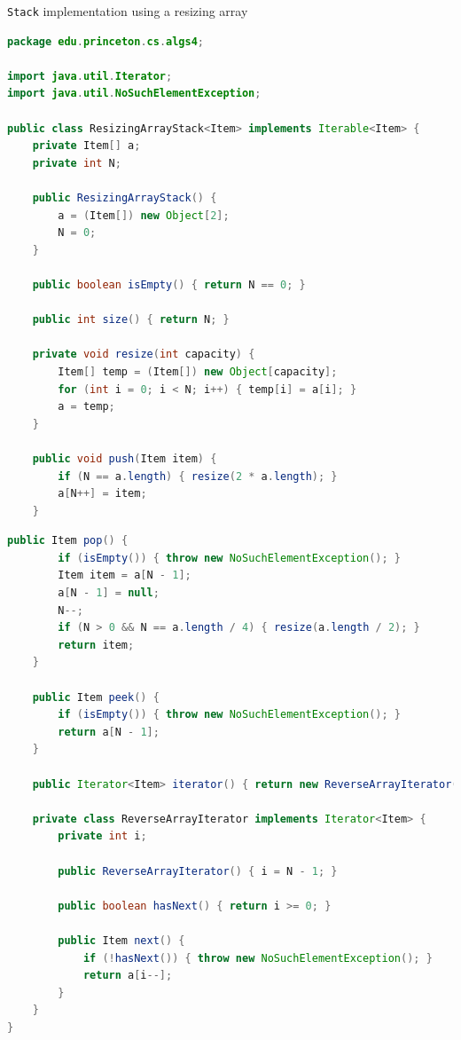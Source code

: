 \documentclass[8pt,a4paper,compress]{beamer}
\begin{document}
\begin{frame}[fragile]
\pause

\lstinline{Stack} implementation using a resizing array

\smallskip

\begin{lstlisting}[language=Java,style=focusin]
package edu.princeton.cs.algs4;

import java.util.Iterator;
import java.util.NoSuchElementException;

public class ResizingArrayStack<Item> implements Iterable<Item> {
    private Item[] a; 
    private int N; 
    
    public ResizingArrayStack() {
        a = (Item[]) new Object[2];
        N = 0;
    }

    public boolean isEmpty() { return N == 0; }

    public int size() { return N; }

    private void resize(int capacity) {
        Item[] temp = (Item[]) new Object[capacity];
        for (int i = 0; i < N; i++) { temp[i] = a[i]; }
        a = temp;
    }

    public void push(Item item) {
        if (N == a.length) { resize(2 * a.length); }
        a[N++] = item; 
    }
\end{lstlisting}
\end{frame}

\begin{frame}[fragile]
\pause

\begin{lstlisting}[language=Java,style=focusin]
    public Item pop() {
        if (isEmpty()) { throw new NoSuchElementException(); }
        Item item = a[N - 1];
        a[N - 1] = null; 
        N--;
        if (N > 0 && N == a.length / 4) { resize(a.length / 2); }
        return item;
    }

    public Item peek() {
        if (isEmpty()) { throw new NoSuchElementException(); }
        return a[N - 1];
    }

    public Iterator<Item> iterator() { return new ReverseArrayIterator(); }

    private class ReverseArrayIterator implements Iterator<Item> {
        private int i;

        public ReverseArrayIterator() { i = N - 1; }

        public boolean hasNext() { return i >= 0; }

        public Item next() {
            if (!hasNext()) { throw new NoSuchElementException(); }
            return a[i--];
        }
    }
}
\end{lstlisting}
\end{frame}
\end{document}
